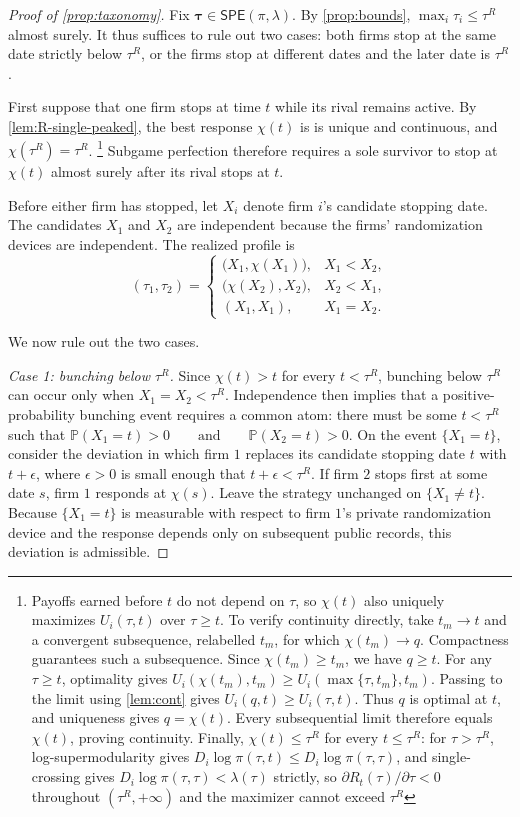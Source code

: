 \documentclass[12pt,reqno]{article}
\renewcommand{\Pr}{\mathbb{P}}
\newcommand{\SPE}{\ensuremath{\mathsf{SPE}}}
\theoremstyle{definition} \newtheorem{example}{Example}
\theoremstyle{definition} \newtheorem{condition}{Condition}
\theoremstyle{definition} \newtheorem{corollary}{Corollary}
\theoremstyle{definition} \newtheorem{claim}{Claim}
\theoremstyle{definition} \newtheorem{definition}{Definition}
\theoremstyle{definition} \newtheorem{conjecture}{Conjecture}
\theoremstyle{definition} \newtheorem{Lemma}{Lemma}
\theoremstyle{definition} \newtheorem{lemma}{Lemma}
\theoremstyle{plain} \newtheorem{theorem}{Theorem}
\theoremstyle{definition} \newtheorem{assumption}{Assumption}
\theoremstyle{definition} \newtheorem*{assumptionnonumber}{Assumption}
\theoremstyle{definition} \newtheorem*{theoremNoNumber}{Proposition}
\theoremstyle{definition}
\theoremstyle{definition}\newtheorem{proposition}{Proposition}
\theoremstyle{definition} \newtheorem{result}{Result}
\theoremstyle{definition} \newtheorem*{definitionNoNumber}{Definition}
\theoremstyle{definition} \newtheorem{Definition}{Definition}
\theoremstyle{definition} \newtheorem*{DefinitionNoNumber}{Definition}
\theoremstyle{definition} \newtheorem*{fact}{Fact}
\theoremstyle{definition} \newtheorem*{property}{Property}
\theoremstyle{definition} \newtheorem{remark}{Remark}
\begin{document}
\begin{proof}[Proof of \cref{prop:taxonomy}]
Fix $\bm\tau\in\SPE(\pi,\lambda)$. By \cref{prop:bounds}, $\max_i\tau_i\leq\tau^R$ almost surely. It thus suffices to rule out two cases: both firms stop
at the same date strictly below $\tau^R$, or the firms stop at different
dates and the later date is $\tau^R$.

First suppose that one firm stops at time $t$ while its rival remains active. By \cref{lem:R-single-peaked}, the best response $\chi(t)$ is  is unique and continuous, and 
$\chi(\tau^R)=\tau^R$.
\footnote{Payoffs earned before $t$ do not depend on $\tau$, so
$\chi(t)$ also uniquely maximizes $U_i(\tau,t)$ over $\tau\geq t$. To verify
continuity directly, take $t_m\to t$ and a convergent subsequence, relabelled
$t_m$, for which $\chi(t_m)\to q$. Compactness guarantees such a subsequence.
Since $\chi(t_m)\geq t_m$, we have $q\geq t$. For any $\tau\geq t$,
optimality gives
$U_i(\chi(t_m),t_m)\geq U_i(\max\{\tau,t_m\},t_m)$. Passing to the limit
using \cref{lem:cont} gives $U_i(q,t)\geq U_i(\tau,t)$. Thus $q$ is optimal
at $t$, and uniqueness gives $q=\chi(t)$. Every subsequential limit therefore
equals $\chi(t)$, proving continuity. Finally, $\chi(t)\leq\tau^R$ for every $t\leq\tau^R$:
for $\tau>\tau^R$, log-supermodularity gives
$D_i\log\pi(\tau,t)\leq D_i\log\pi(\tau,\tau)$, and single-crossing gives
$D_i\log\pi(\tau,\tau)<\lambda(\tau)$ strictly, so
$\partial R_t(\tau)/\partial\tau<0$ throughout $(\tau^R,+\infty)$ and the
maximizer cannot exceed $\tau^R$}
Subgame perfection therefore requires a sole survivor to stop at $\chi(t)$
almost surely after its rival stops at $t$.

Before either firm has stopped, let $X_i$ denote firm $i$'s candidate stopping date. The candidates $X_1$ and $X_2$ are independent because the firms' randomization devices are independent. The realized profile is
\[
(\tau_1,\tau_2)
=
\begin{cases}
\bigl(X_1,\chi(X_1)\bigr),&X_1<X_2,\\[2mm]
\bigl(\chi(X_2),X_2\bigr),&X_2<X_1,\\[2mm]
(X_1,X_1),&X_1=X_2.
\end{cases}
\]

We now rule out the two cases. 

\noindent\emph{Case 1: bunching below $\tau^R$.}
Since $\chi(t)>t$ for every $t<\tau^R$, bunching below $\tau^R$ can occur only when $X_1=X_2<\tau^R$. Independence then implies that a positive-probability bunching event requires a common atom: there must be some $t<\tau^R$ such that $
\Pr(X_1=t)>0
\qquad\text{and}\qquad
\Pr(X_2=t)>0.$ On the event $\{X_1=t\}$, consider the deviation in which firm $1$ replaces its candidate stopping date $t$
with $t+\epsilon$, where $\epsilon>0$ is small enough that
$t+\epsilon<\tau^R$. If firm $2$ stops first at some date $s$, firm $1$
responds at $\chi(s)$. Leave the strategy unchanged on $\{X_1\neq t\}$.
Because $\{X_1=t\}$ is measurable with respect to firm $1$'s private
randomization device and the response depends only on subsequent public
records, this deviation is admissible.


\end{proof}
\end{document}
